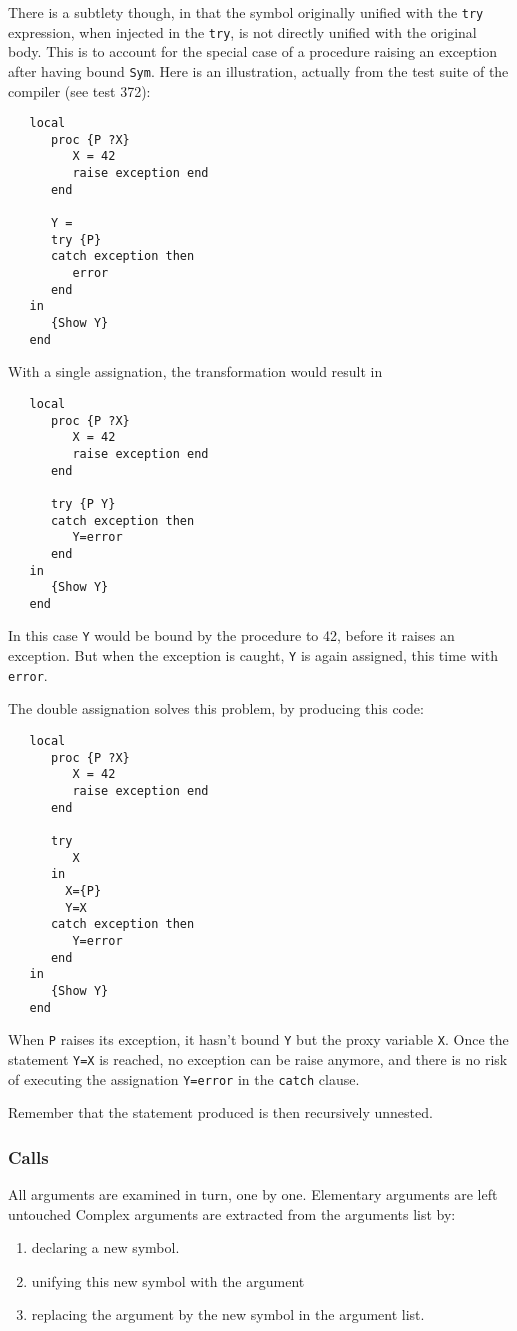 \documentclass[a4paper]{memoir}
\begin{document}
There is a subtlety though, in that the symbol originally unified with the \lstinline!try!
expression, when injected in the \lstinline!try!, is not directly unified with
the original body. This is to account for the special case of a procedure
raising an exception after having bound \lstinline!Sym!. Here is an
illustration, actually from the test suite of the compiler (see test 372):
\begin{lstlisting}
   local
      proc {P ?X}
         X = 42
         raise exception end
      end
   
      Y =
      try {P}
      catch exception then
         error
      end
   in
      {Show Y}
   end
\end{lstlisting}
With a single assignation, the transformation would result in 
\begin{lstlisting}
   local
      proc {P ?X}
         X = 42
         raise exception end
      end
   
      try {P Y}
      catch exception then
         Y=error
      end
   in
      {Show Y}
   end
\end{lstlisting}


In this case \lstinline!Y! would be bound by
the procedure to 42, before it raises an exception. 
But when the exception is caught, \lstinline!Y! is again
assigned, this time with \lstinline!error!.

The double assignation solves this problem, by producing this code:
\begin{lstlisting}
   local
      proc {P ?X}
         X = 42
         raise exception end
      end
   
      try 
         X
      in 
        X={P}
        Y=X
      catch exception then
         Y=error
      end
   in
      {Show Y}
   end
\end{lstlisting}

When \lstinline!P! raises its exception, it hasn't bound \lstinline!Y! but the
proxy variable \lstinline!X!. Once the statement \lstinline!Y=X! is reached, no
exception can be raise anymore, and there is no risk of executing the
assignation \lstinline!Y=error! in the \lstinline!catch! clause.


Remember that the statement produced is then recursively unnested.




\subsubsection{Calls}\label{sec:arch:unnester:calls}
All arguments are examined in turn, one by one. Elementary arguments are left untouched
Complex arguments are extracted from the arguments list by:
\begin{enumerate}
  \item declaring a new symbol. 
  \item unifying this new symbol with the argument
  \item replacing the argument by the new symbol in the argument list.
\end{enumerate}
\end{document}
